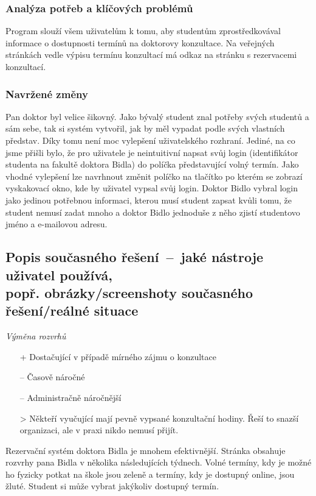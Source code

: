 \subsubsection*{Analýza potřeb a klíčových problémů}

Program slouží všem uživatelům k tomu, aby studentům zprostředkovával informace o dostupnosti termínů na doktorovy konzultace. Na veřejných stránkách vedle výpisu termínu konzultací má odkaz na stránku s rezervacemi konzultací.

\subsubsection*{Navržené změny}
Pan doktor byl velice šikovný. Jako bývalý student znal potřeby svých studentů a sám sebe, tak si systém vytvořil, jak by měl vypadat podle svých vlastních představ. Díky tomu není moc vylepšení uživatelského rozhraní. Jediné, na co jsme přišli bylo, že pro uživatele je neintuitivní napsat svůj login (identifikátor studenta na fakultě doktora Bidla) do políčka představující volný termín. Jako vhodné vylepšení lze navrhnout změnit políčko na tlačítko po kterém se zobrazí vyskakovací okno, kde by uživatel vypsal svůj login. Doktor Bidlo vybral login jako jedinou potřebnou informaci, kterou musí student zapsat kvůli tomu, že student nemusí zadat mnoho a doktor Bidlo jednoduše z něho zjistí studentovo jméno a e-mailovou adresu.

\newpage
\subsection{Popis současného řešení\ --\ jaké nástroje uživatel používá, \\
popř. obrázky/screenshoty současného řešení/reálné situace}

\noindent\emph{Výměna rozvrhů} 
\begin{itemize}
    \item[+] Dostačující v případě mírného zájmu o konzultace
    \item[--] Časově náročné
    \item[--] Administračně náročnější
	\item[>] Někteří vyučující mají pevně vypsané konzultační hodiny. Řeší to snazší organizaci, ale v praxi nikdo nemusí přijít.
\end{itemize}

Rezervační systém doktora Bidla je mnohem efektivnější. Stránka obsahuje rozvrhy pana Bidla v několika následujících týdnech. Volné termíny, kdy je možné ho fyzicky potkat na škole jsou zeleně a termíny, kdy je dostupný online, jsou žluté. Student si může vybrat jakýkoliv dostupný termín. 

